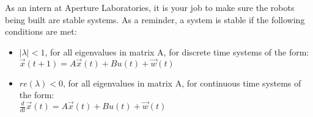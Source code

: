 
As an intern at Aperture Laboratories, it is your job to make sure the robots being built are stable systems.
As a reminder, a system is stable if the following conditions are met:

\begin{itemize}

\item $|\lambda{}| < 1$, for all eigenvalues in matrix A, for discrete time systems of the form:\\
$\vec{x}(t+1) = A\vec{x}(t) + Bu(t) + \vec{w}(t)$

\item $re(\lambda{})< 0$, for all eigenvalues in matrix A, for continuous time systems of the form:\\
$\frac{d}{dt}\vec{x}(t) = A\vec{x}(t) + Bu(t) + \vec{w}(t)$

\end{itemize}


